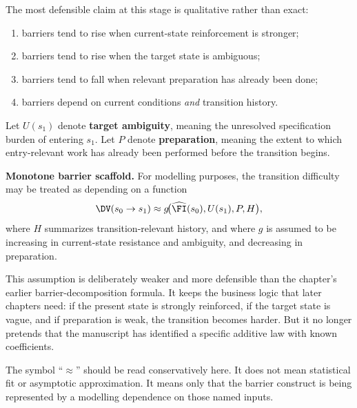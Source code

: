 The most defensible claim at this stage is qualitative rather than exact:
\begin{enumerate}[nosep]
  \item barriers tend to rise when current-state reinforcement is stronger;
  \item barriers tend to rise when the target state is ambiguous;
  \item barriers tend to fall when relevant preparation has already been done;
  \item barriers depend on current conditions \emph{and} transition history.
\end{enumerate}

\begin{definition}
Let $U(s_1)$ denote \textbf{target ambiguity}, meaning the unresolved
specification burden of entering $s_1$. Let $P$ denote \textbf{preparation},
meaning the extent to which entry-relevant work has already been performed
before the transition begins.
\end{definition}

\begin{remark}
\textbf{Monotone barrier scaffold.}
For modelling purposes, the transition difficulty may be treated as depending
on a function
\[
  \DV(s_0 \to s_1) \approx g\!\bigl(\widehat{\FI}(s_0), U(s_1), P, H\bigr),
\]
where $H$ summarizes transition-relevant history, and where $g$ is assumed to
be increasing in current-state resistance and ambiguity, and decreasing in
preparation.
\end{remark}

\begin{discussion}
This assumption is deliberately weaker and more defensible than the chapter's
earlier barrier-decomposition formula. It keeps the business logic that later
chapters need: if the present state is strongly reinforced, if the target state
is vague, and if preparation is weak, the transition becomes harder. But it no
longer pretends that the manuscript has identified a specific additive law with
known coefficients.
\end{discussion}

\begin{remark}
The symbol ``$\approx$'' should be read conservatively here. It does not mean
statistical fit or asymptotic approximation. It means only that the barrier
construct is being represented by a modelling dependence on those named inputs.
\end{remark}

